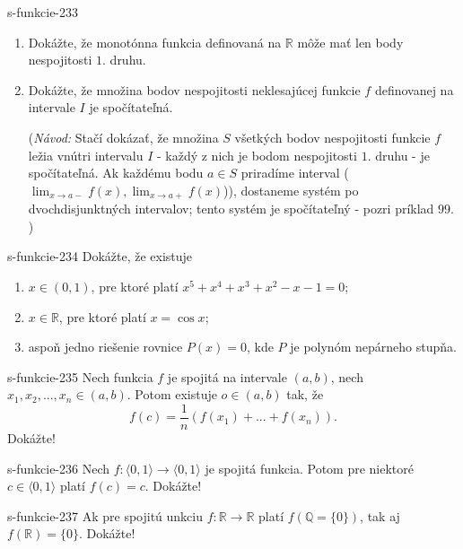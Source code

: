   \begin{defproblem}{s-funkcie-233}
  \begin{enumerate}
  \item Dokážte, že monotónna funkcia definovaná na $\mathbb{R}$ môže mať len body nespojitosti $1.$ druhu.
  \item Dokážte, že množina bodov nespojitosti neklesajúcej funkcie $f$ definovanej na intervale $I$ je spočítateľná.

  (\textit{Návod:} Stačí dokázať, že množina $S$ všetkých bodov nespojitosti funkcie $f$ ležia vnútri intervalu $I$ - každý z nich je bodom nespojitosti $1.$ druhu - je spočítateľná. Ak každému bodu $a \in S$ priradíme interval ($\lim_{x \rightarrow a-}f(x),\lim_{x \rightarrow a+}f(x)$)), dostaneme systém po dvochdisjunktných intervalov; tento systém je spočítateľný - pozri príklad $99$. )

  \end{enumerate}
  \end{defproblem}

  \begin{defproblem}{s-funkcie-234}
  Dokážte, že existuje
  \begin{enumerate}
  \item $x \in (0,1)$, pre ktoré platí $x^5+x^4+x^3+x^2-x-1=0$;
  \item $x \in \mathbb{R}$, pre ktoré platí $x=\cos x$;
  \item aspoň jedno riešenie rovnice $P(x)=0$, kde $P$ je polynóm nepárneho stupňa.
  \end{enumerate}
  \end{defproblem}

  \begin{defproblem}{s-funkcie-235}
  Nech funkcia $f$ je spojitá na intervale $(a,b)$, nech $x_1,x_2,...,x_n \in (a,b)$. Potom existuje $o \in (a,b)$ tak, že
  $$f(c)=\frac{1}{n}(f(x_1)+...+f(x_n)).$$ Dokážte!
  \end{defproblem}

  \begin{defproblem}{s-funkcie-236}
  Nech $f:\langle 0,1 \rangle \rightarrow \langle 0,1 \rangle$ je spojitá funkcia. Potom pre niektoré $c \in \langle 0,1 \rangle$ platí $f(c)=c$. Dokážte!
  \end{defproblem}

  \begin{defproblem}{s-funkcie-237}
  Ak pre spojitú unkciu $f: \mathbb{R} \rightarrow \mathbb{R}$ platí $f(\mathbb{Q}= \{0\})$, tak aj $f(\mathbb{R})=\{0\}$. Dokážte!
  \end{defproblem}

